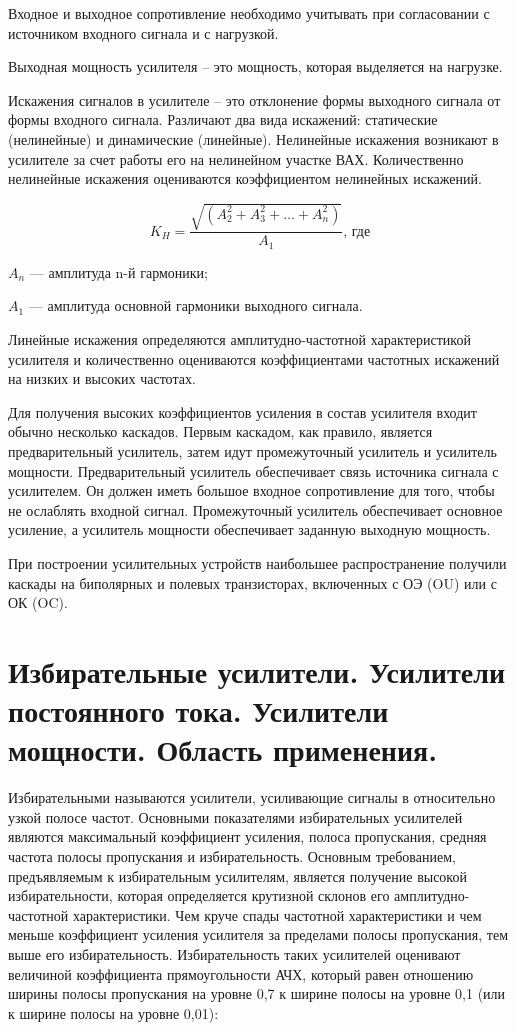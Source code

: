 \documentclass[unicode, 12pt, a4paper, oneside]{article}
\begin{document}
Входное и выходное сопротивление необходимо учитывать при согласовании с источником входного сигнала и с нагрузкой. 

Выходная мощность усилителя – это мощность, которая выделяется на нагрузке.

Искажения сигналов в усилителе – это отклонение формы выходного сигнала от формы входного сигнала. Различают два вида искажений: статические (нелинейные) и динамические (линейные). Нелинейные искажения возникают в усилителе за счет работы его на нелинейном участке ВАХ. Количественно нелинейные искажения оцениваются коэффициентом нелинейных искажений.

\begin{equation}
K_{H} = \dfrac{\sqrt{(A_{2}^{2} + A_{3}^{2} + \ldots + A_{n}^{2})} }{A_{1}}\text{, где}
\end{equation}
\par $A_{n}$ --- амплитуда n-й гармоники;
\par $A_{1}$ --- амплитуда основной гармоники выходного сигнала.

Линейные искажения определяются амплитудно-частотной характеристикой усилителя и количественно оцениваются коэффициентами частотных искажений на низких и высоких частотах.

Для получения высоких коэффициентов усиления в состав усилителя входит обычно несколько каскадов. Первым каскадом, как правило, является предварительный усилитель, затем идут промежуточный усилитель и усилитель мощности. Предварительный усилитель обеспечивает связь источника сигнала с усилителем. Он должен иметь большое входное сопротивление для того, чтобы не ослаблять входной сигнал. Промежуточный усилитель обеспечивает основное усиление, а усилитель мощности обеспечивает заданную выходную мощность.

При построении усилительных устройств наибольшее распространение получили каскады на биполярных и полевых транзисторах, включенных с ОЭ (OU) или с ОК (OC).

\section{Избирательные усилители. Усилители постоянного тока. Усилители мощности. Область применения.}

Избирательными называются усилители, усиливающие сигналы в относительно узкой полосе частот. Основными показателями избирательных усилителей являются максимальный коэффициент усиления, полоса пропускания, средняя частота полосы пропускания и избирательность. Основным требованием, предъявляемым к избирательным усилителям, является получение высокой избирательности, которая определяется крутизной склонов его амплитудно-частотной характеристики. Чем круче спады частотной характеристики и чем меньше коэффициент усиления усилителя за пределами полосы пропускания, тем выше его избирательность. Избирательность таких усилителей оценивают величиной коэффициента прямоугольности АЧХ, который равен отношению ширины полосы пропускания на уровне 0,7 к ширине полосы на уровне 0,1 (или к ширине полосы на уровне 0,01):
\end{document}
